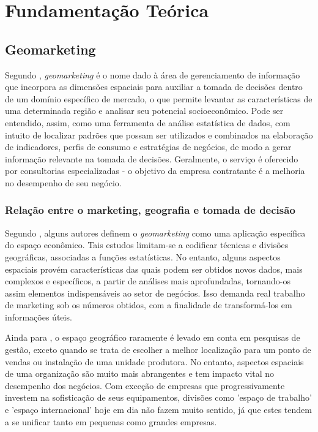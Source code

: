 
\chapter{Fundamentação Teórica}
\label{fundamentacao-teorica}

\section{Geomarketing}
\label{Geom}
Segundo , \emph{geomarketing} é o nome dado à área de
gerenciamento de informação que incorpora as dimensões espaciais para auxiliar a
tomada de decisões dentro de um domínio específico de mercado, o que permite
levantar as características de uma determinada região e analisar seu potencial
socioeconômico. Pode ser entendido, assim, como uma ferramenta de análise
estatística de dados, com intuito de localizar padrões que possam ser utilizados
e combinados na elaboração de indicadores, perfis de consumo e estratégias de
negócios, de modo a gerar informação relevante na tomada de decisões.
Geralmente, o serviço é oferecido por consultorias especializadas - o  objetivo
da empresa contratante é a melhoria no desempenho de seu negócio.

\subsection{Relação entre o marketing, geografia e tomada de decisão}
Segundo , alguns autores definem o \emph{geomarketing} como uma aplicação específica do espaço econômico. Tais estudos limitam-se a codificar técnicas e divisões geográficas, associadas a funções estatísticas. No entanto, alguns aspectos espaciais provém características das quais podem ser obtidos novos dados, mais complexos e específicos, a partir de análises mais aprofundadas, tornando-os assim elementos indispensáveis ao setor de negócios. Isso demanda real trabalho de marketing sob os números obtidos, com a finalidade de transformá-los em informações úteis.

Ainda para , o espaço geográfico raramente é levado em conta em pesquisas de gestão, exceto quando se trata de escolher a melhor localização para um ponto de vendas ou instalação de uma unidade produtora. No entanto, aspectos espaciais de uma organização são muito mais abrangentes e tem impacto vital no desempenho dos negócios. Com exceção de empresas que progressivamente investem na sofisticação de seus equipamentos, divisões como 'espaço de trabalho' e 'espaço internacional' hoje em dia não fazem muito sentido, já que estes tendem a se unificar tanto em pequenas como grandes empresas.

